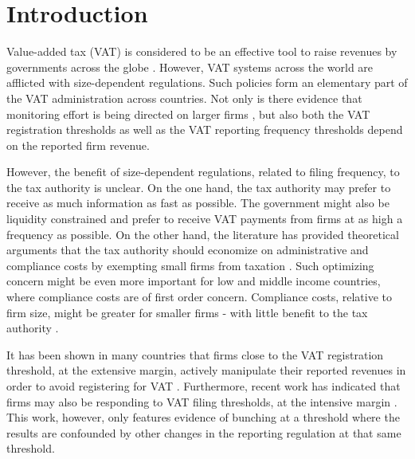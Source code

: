 \section{Introduction}
Value-added tax (VAT) is considered to be an effective tool to raise revenues by governments across the globe \citep{keen2006vat}. However, VAT systems across the world are afflicted with size-dependent regulations. Such policies form an elementary part of the VAT administration across countries. Not only is there evidence that monitoring effort is being directed on larger firms \citep{almunia2018under,bachas2017size}, but also both the VAT registration thresholds as well as the VAT reporting frequency thresholds depend on the reported firm revenue.

However, the benefit of size-dependent regulations, related to filing frequency, to the tax authority is unclear. On the one hand, the tax authority may prefer to receive as much information as fast as possible. The government might also be liquidity constrained and 
prefer to receive VAT payments from firms at as high a frequency as possible. On the other hand, the literature has provided theoretical arguments that the tax authority should economize on administrative and compliance costs by exempting small firms from taxation \citep{dharmapala2011tax}. Such optimizing concern might be even more important for low and middle income countries, where compliance costs are of first order concern. Compliance costs, relative to firm size, might be greater for smaller firms - with little benefit to the tax authority \citep{internationaltaxdialogue2007,internationaltaxdialogue2013}. 

It has been shown in many countries that firms close to the VAT registration threshold, at the extensive margin, actively manipulate their reported revenues in order to avoid registering for VAT \citep{onji2009response,gebresilasse2016firm,liu2017vat,harju2016effects, boonzaaier2017small}. Furthermore, recent work has indicated that firms may also be responding to VAT filing thresholds, at the intensive margin \citep{asatryan2017responses}. This work, however, only features evidence of bunching at a threshold where the results are confounded by other changes in the reporting regulation at that same threshold.

